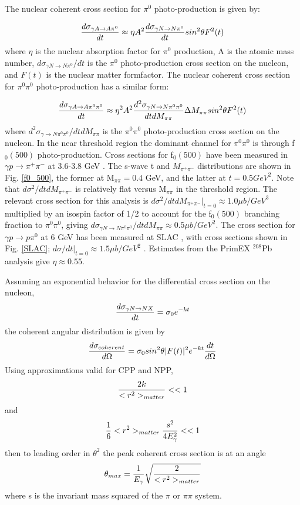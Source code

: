 The nuclear coherent cross section for  $\pi^0$ photo-production is given by: 

$$ {d\sigma_{\gamma A \rightarrow A  \pi^0 } \over dt } \approx \eta A^2 { d\sigma_{\gamma N \rightarrow N \pi^0 } \over dt }sin^2 \theta F^2(t) $$
where $\eta$ is the nuclear absorption factor for $\pi^0$ production, A is the atomic mass number, $d\sigma_{\gamma N \rightarrow N\pi^0 } / dt$ is the $\pi^0$ photo-production cross section on the nucleon, and $F(t)$ is the nuclear matter formfactor.  The nuclear coherent cross section for  $\pi^0 \pi^0$ photo-production has a similar form: 

$$ {d\sigma_{\gamma A \rightarrow A  \pi^0 \pi^0} \over dt } \approx  \eta^2 A^2 { d^2 \sigma_{\gamma N \rightarrow N \pi^0 \pi^0} \over dt dM_{\pi \pi}}\Delta M_{\pi \pi} sin^2 \theta F^2(t) $$
where $d^2\sigma_{\gamma \rightarrow N\pi^0 \pi^0} / dt dM_{\pi \pi}$ is the $\pi^0 \pi^0$ photo-production cross section on the nucleon.
  In the near threshold region the dominant channel for $\pi^0 \pi^0$ is through f$_0(500)$ photo-production.    Cross sections for f$_0(500)$   have been measured in 
  $\gamma p \rightarrow \pi^+ \pi^-$ at 3.6-3.8 GeV \cite{Battaglieri:2009aa}.   The s-wave t and $M_{\pi^+ \pi^-}$ distributions are shown in Fig. \ref{f0_500}, the former at M$_{\pi \pi}=0.4$ GeV, and the latter at $t=0.5 GeV^2$.  Note that  
  $d\sigma^2 / dt dM_{\pi^+ \pi^-}$ is relatively flat versus M$_{\pi \pi}$ in the threshold region. The relevant cross section for this analysis is $d\sigma^2 / dt dM_{\pi^+ \pi^-}|_{ t = 0} \approx 1.0 \mu b/GeV^3$  multiplied by an isospin factor of 1/2 to account for the f$_0(500)$ branching fraction to $\pi^0 \pi^0$, giving $d \sigma_{\gamma N \rightarrow N \pi^0 \pi^0} / dt dM_{\pi \pi} \approx 0.5 \mu b / GeV^2 $. The cross section for  $\gamma p \rightarrow  p \pi^0$ at 6 GeV has been measured at SLAC \cite{Anderson:1971}, with cross sections shown in Fig. \ref{SLAC};   $d\sigma / dt|_{t=0} \approx 1.5 \mu b/GeV^2$ .   Estimates from the PrimEX $^{208}$Pb analysis give $\eta \approx 0.55$.  
  
  Assuming an exponential behavior for the differential cross section on the nucleon, 
  $$ {d\sigma_{\gamma N \rightarrow N X} \over dt} = \sigma_0 e^{-kt}$$
  the coherent angular distribution is given by
  $$ { d\sigma_{coherent} \over d\Omega} = \sigma_0 sin^2 \theta |F(t)|^2 e^{-kt} {dt \over d\Omega}$$ 
  Using approximations valid for CPP and NPP, 
  $$ {2k \over <r^2>_{matter}}<<1 $$
  and 
  $${1 \over 6}<r^2>_{matter} {s^2 \over 4E^2_\gamma}<<1$$
  then to leading order in $\theta^2$ the peak coherent cross section is at an angle 
$$ \theta_{max}={1 \over E_\gamma}\sqrt{ 2 
 \over <r^2>_{matter} } $$
 where s is the invariant mass squared of the $\pi$ or $\pi \pi$ system. 
 
